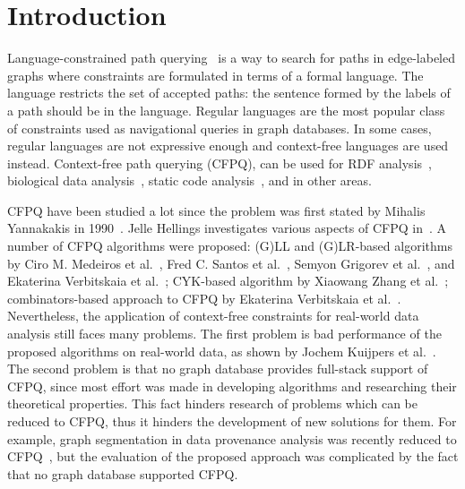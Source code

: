 \section{Introduction}

Language-constrained path querying~\cite{doi:10.1137/S0097539798337716} is a way to search for paths in edge-labeled graphs where constraints are formulated in terms of a formal language.
The language restricts the set of accepted paths: the sentence formed by the labels of a path should be in the language.
Regular languages are the most popular class of constraints used as navigational queries in graph databases.
In some cases, regular languages are not expressive enough and context-free languages are used instead.
Context-free path querying (CFPQ), can be used for RDF analysis~\cite{10.1007/978-3-319-46523-4_38}, biological data analysis~\cite{SubgraphQueriesbyContextfreeGrammars}, static code analysis~\cite{Zheng,10.1145/373243.360208}, and in other areas.

CFPQ have been studied a lot since the problem was first stated by Mihalis Yannakakis in 1990~\cite{Yannakakis}.
Jelle Hellings investigates various aspects of CFPQ in~\cite{hellingsPathQuerying,hellingsRelational,DBLP:journals/corr/Hellings15}.
A number of CFPQ algorithms were proposed: (G)LL and (G)LR-based algorithms by Ciro M. Medeiros et al.~\cite{Medeiros:2018:EEC:3167132.3167265}, Fred C. Santos et al.~\cite{10.1007/978-3-319-91662-0_17}, Semyon Grigorev et al.~\cite{Grigorev:2017:CPQ:3166094.3166104}, and Ekaterina Verbitskaia et al.~\cite{10.1007/978-3-319-41579-6_22}; CYK-based algorithm by Xiaowang Zhang et al.~\cite{10.1007/978-3-319-46523-4_38}; combinators-based approach to CFPQ by Ekaterina Verbitskaia et al.~\cite{Verbitskaia:2018:PCC:3241653.3241655}.
Nevertheless, the application of context-free constraints for real-world data analysis still faces many problems.
The first problem is bad performance of the proposed algorithms on real-world data, as shown by Jochem Kuijpers et al.~\cite{Kuijpers:2019:ESC:3335783.3335791}.
The second problem is that no graph database provides full-stack support of CFPQ, since most effort was made in developing algorithms and researching their theoretical properties.
This fact hinders research of problems which can be reduced to CFPQ, thus it hinders the development of new solutions for them.
For example, graph segmentation in data provenance analysis was recently reduced to CFPQ~\cite{8731467}, but the evaluation of the proposed approach was complicated by the fact that no graph database supported CFPQ.

